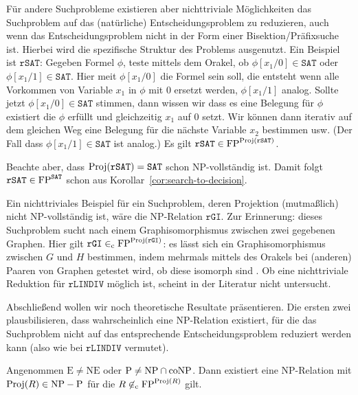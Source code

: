 Für andere Suchprobleme existieren aber nichttriviale Möglichkeiten  das Suchproblem auf das (natürliche) Entscheidungsproblem zu reduzieren, auch wenn das Entscheidungsproblem nicht in der Form einer Bisektion/Präfixsuche ist. Hierbei wird die spezifische Struktur des Problems ausgenutzt. Ein Beispiel ist $\mathtt{rSAT}$: Gegeben Formel $\phi$, teste mittels dem Orakel, ob $\phi[x_1/0]\in\mathtt{SAT}$ oder $\phi[x_1/1]\in\mathtt{SAT}$. Hier meit $\phi[x_1/0]$ die Formel sein soll, die entsteht wenn alle Vorkommen von Variable $x_1$ in $\phi$ mit $0$ ersetzt werden, $\phi[x_1/1]$ analog. Sollte jetzt $\phi[x_1/0]\in\mathtt{SAT}$ stimmen, dann wissen wir dass es eine Belegung für $\phi$ existiert die $\phi$ erfüllt und gleichzeitig $x_1$ auf $0$ setzt. Wir können dann iterativ auf dem gleichen Weg eine Belegung für die nächste Variable $x_2$ bestimmen usw. (Der Fall dass $\phi[x_1/1]\in\mathtt{SAT}$ ist analog.) Es gilt $\mathtt{rSAT}\in\mathrm{FP}^{\operatorname{Proj}(\mathtt{rSAT})}$.

Beachte aber, dass $\operatorname{Proj}(\mathtt{rSAT})=\mathtt{SAT}$ schon NP-vollständig ist. Damit folgt $\mathtt{rSAT}\in \mathrm{FP}^{\mathtt{SAT}}$ schon aus Korollar~\ref{cor:search-to-decision}.

Ein nichttriviales Beispiel für ein Suchproblem, deren Projektion (mutmaßlich) nicht NP-vollständig ist, wäre die NP-Relation $\mathtt{rGI}$. Zur Erinnerung: dieses Suchproblem sucht nach einem Graphisomorphismus zwischen zwei gegebenen Graphen.
Hier gilt $\mathtt{rGI}\in_\mathrm{c} \mathrm{FP}^{\operatorname{Proj}(\mathtt{rGI})}$: es lässt sich ein Graphisomorphismus zwischen $G$ und $H$ bestimmen, indem mehrmals mittels des Orakels bei (anderen) Paaren von  Graphen getestet wird, ob diese isomorph sind \parencite[vgl.][S. 65, 100]{goldreich_computational_2008}.
Ob eine nichttriviale Reduktion für $\mathtt{rLINDIV}$ möglich ist, scheint in der Literatur nicht untersucht.

Abschließend wollen wir noch theoretische Resultate präsentieren. Die ersten zwei plausbilisieren, dass wahrscheinlich eine NP-Relation existiert, für die das Suchproblem nicht auf das entsprechende Entscheidungsproblem reduziert werden kann (also wie bei $\mathtt{rLINDIV}$ vermutet).

\begin{theorem}
    Angenommen $\mathrm{E\neq NE}$ oder $\mathrm{P}\neq \mathrm{NP}\cap\mathrm{coNP}$. Dann existiert eine NP-Relation mit $\operatorname{Proj}(R)\in \mathrm{NP}-\mathrm{P}$ für die $R\not\in_\mathrm{c}\mathrm{FP}^{\operatorname{Proj}(R)}$ gilt.
\end{theorem}

